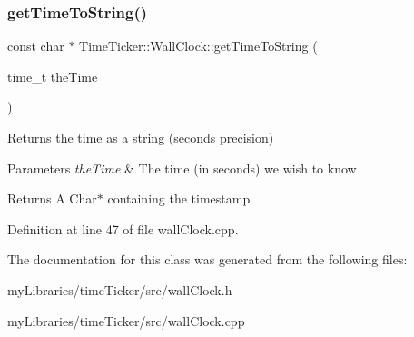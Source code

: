 \subsubsection{\texorpdfstring{getTimeToString()}{getTimeToString()}}
{\footnotesize\ttfamily const char $\ast$ Time\+Ticker\+::\+Wall\+Clock\+::get\+Time\+To\+String (\begin{DoxyParamCaption}\item[{time\+\_\+t}]{the\+Time }\end{DoxyParamCaption})}



Returns the time as a string (seconds precision) 


\begin{DoxyParams}{Parameters}
{\em the\+Time} & The time (in seconds) we wish to know \\
\hline
\end{DoxyParams}
\begin{DoxyReturn}{Returns}
A Char$\ast$ containing the timestamp 
\end{DoxyReturn}


Definition at line 47 of file wall\+Clock.\+cpp.



The documentation for this class was generated from the following files\+:\begin{DoxyCompactItemize}
\item 
my\+Libraries/time\+Ticker/src/wall\+Clock.\+h\item 
my\+Libraries/time\+Ticker/src/wall\+Clock.\+cpp\end{DoxyCompactItemize}
